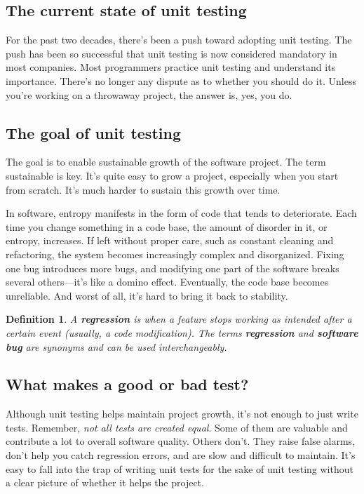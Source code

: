 \documentclass{article}
\newtheorem{definition}{Definition}
\begin{document}
\subsection{The current state of unit testing}
For the past two decades, there’s been a push toward adopting unit testing. The push has been so successful that unit testing is now considered mandatory in most companies. Most programmers practice unit testing and understand its importance. There’s no longer any dispute as to whether you should do it. Unless you’re working on a throwaway project, the answer is, yes, you do.

\subsection{ The goal of unit testing}
The goal is to enable sustainable growth of the software project. The term sustainable is key. It’s quite easy to grow a project, especially when you start from scratch. It’s much harder to sustain this growth over time.

In software, entropy manifests in the form of code that tends to deteriorate. Each time you change something in a code base, the amount of disorder in it, or entropy, increases. If left without proper care, such as constant cleaning and refactoring, the system becomes increasingly complex and disorganized. Fixing one bug introduces more bugs, and modifying one part of the software breaks several others—it’s like a domino effect. Eventually, the code base becomes unreliable. And worst of all, it’s hard to bring it back to stability.

\begin{definition}
A \textbf{regression} \cite{regression_testing_in_practice} is when a feature stops working as intended after a certain event (usually, a code modification). The terms \textbf{regression} and \textbf{software bug} are synonyms and can be used interchangeably.
\end{definition}

\subsection{What makes a good or bad test?}
Although unit testing helps maintain project growth, it’s not enough to just write tests. 
Remember, \textit{not all tests are created equal}. Some of them are valuable and contribute a lot to overall software quality. Others don’t. They raise false alarms, don’t help you catch regression errors, and are slow and difficult to maintain. It’s easy to fall into the trap of writing unit tests for the sake of unit testing without a clear picture of whether it
helps the project.
\end{document}
